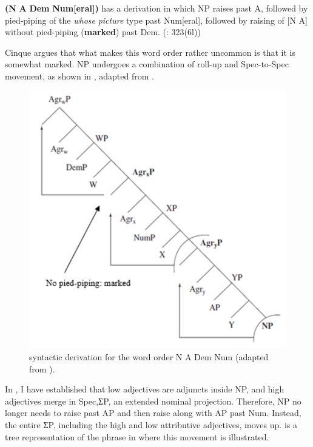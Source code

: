 \documentclass[output=paper]{langscibook}
\begin{document}
\ea\label{ex:baron:15}
\textbf{(N} \textbf{A} \textbf{Dem} \textbf{Num[eral])} has a derivation in which NP raises past A, followed by pied-piping of the \textit{whose} \textit{picture} type past Num[eral], followed by raising of [N A] without  pied-piping (\textbf{marked}) past Dem.        (\citealt{Cinque2005}: 323(6l))
\z

Cinque argues that what makes this word order rather uncommon is that it is somewhat marked. NP undergoes a combination of roll-up and Spec-to-Spec movement, as shown in , adapted from \citet{Cinque2005}.

  
\begin{figure}
\includegraphics[width=\textwidth]{figures/baron-img2.png}
\caption{syntactic derivation for the word order N A Dem Num (adapted from \citealt{Cinque2005}).} 
\label{fig:baron:2}
\end{figure}

In , I have established that low adjectives are adjuncts inside NP, and high adjectives merge in Spec,ƩP, an extended nominal projection. Therefore, NP no longer needs to raise past AP and then raise along with AP past Num. Instead, the entire ƩP, including the high and low attributive adjectives, moves up.  is a tree representation of the phrase in  where this movement is illustrated.
\end{document}
